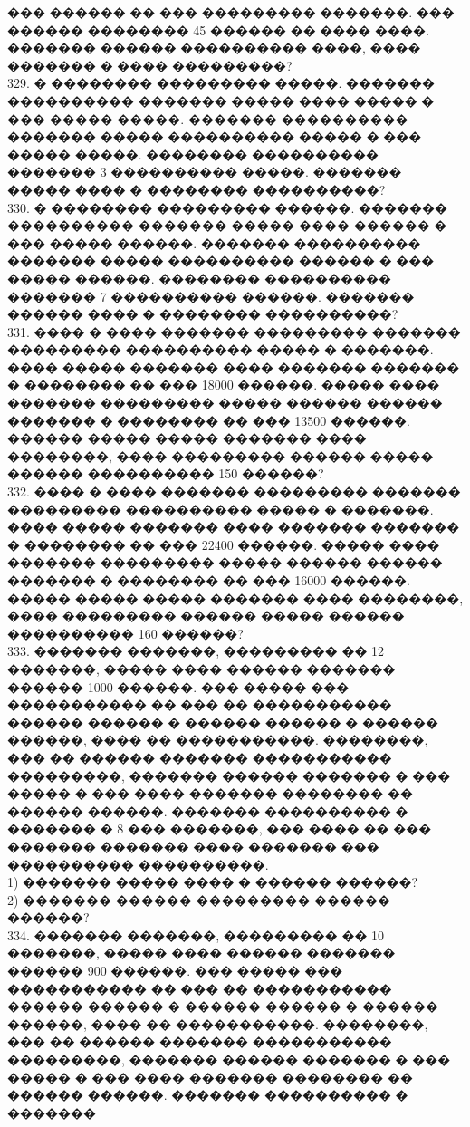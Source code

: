 \documentclass[12pt]{article}
\begin{document}
��� ������ �� ��� ��������� �������. ��� ������ �������� 45 ������ �� ���� ����. ������� ������ ���������� ����, ���� ������� � ���� ���������?\\
329. � �������� ��������� �����. ������� ���������� ������� ����� ���� ����� � ��� ����� �����. ������� ���������� ������� ����� ���������� ����� � ���
����� �����. �������� ���������� ������� 3 ���������� �����. ������� ����� ���� � �������� ����������?\\
330. � �������� ��������� ������. ������� ���������� ������� ����� ���� ������ � ��� ����� ������. ������� ���������� ������� ����� ���������� ������
� ��� ����� ������. �������� ���������� ������� 7 ���������� ������. ������� ������ ���� � �������� ����������?\\
331. ���� � ���� ������� ��������� ������� ��������� ���������� ����� � �������. ���� �����
������� ���� ������� ������� � �������� �� ��� 18000 ������. ����� ���� ������� ��������� �����
������ ������ ������� � �������� �� ��� 13500 ������. ������ ����� ����� ������� ���� ��������,
���� ��������� ������ ����� ������ ���������� 150 ������?\\
332.  ���� � ���� ������� ��������� ������� ��������� ���������� ����� � �������. ���� �����
������� ���� ������� ������� � �������� �� ��� 22400 ������. ����� ���� ������� ��������� �����
������ ������ ������� � �������� �� ��� 16000 ������. ����� ����� ����� ������� ���� ��������,
���� ��������� ������ ����� ������ ���������� 160 ������?\\
333.  ������� �������, ��������� �� 12 �������, ����� ���� ������ ������� ������ 1000 ������.
��� ����� ��� ����������� �� ��� �� ����������� ������ ������ � ������ ������ � ������ ������,
���� �� �����������. ��������, ��� �� ������ ������� ����������� ���������, ������� ������
������� � ��� ����� � ��� ���� ������� �������� �� ������ ������. ������� ���������� � �������
� 8 ��� �������, ��� ���� �� ��� ������� ������� ���� ������� ��� ���������� ����������.\\
1) ������� ����� ���� � ������ ������?\\
2) ������� ������ ��������� ������ ������?\\
334. ������� �������, ��������� �� 10 �������, ����� ���� ������ ������� ������ 900 ������.
��� ����� ��� ����������� �� ��� �� ����������� ������ ������ � ������ ������ � ������ ������,
���� �� �����������. ��������, ��� �� ������ ������� ����������� ���������, ������� ������
������� � ��� ����� � ��� ���� ������� �������� �� ������ ������. ������� ���������� � �������
\end{document}
